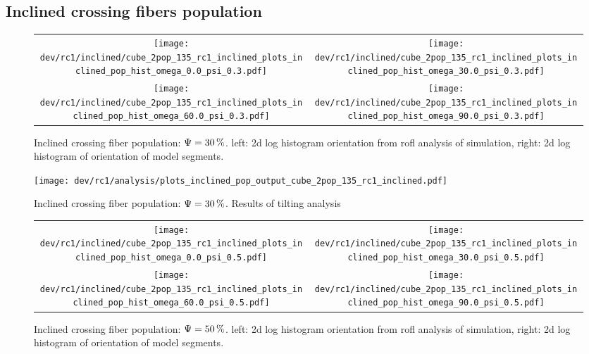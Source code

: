 \subsection{Inclined crossing fibers population}
\label{sec:resInclCross}
% 
\begin{figure}[!t]
\centering
\setlength{\width}{0.45\textwidth}
\begin{tabular}{c|c}
    \texttt{[image: dev/rc1/inclined/cube\_2pop\_135\_rc1\_inclined\_plots\_inclined\_pop\_hist\_omega\_0.0\_psi\_0.3.pdf]} &
    \texttt{[image: dev/rc1/inclined/cube\_2pop\_135\_rc1\_inclined\_plots\_inclined\_pop\_hist\_omega\_30.0\_psi\_0.3.pdf]} \\ \texttt{[image: dev/rc1/inclined/cube\_2pop\_135\_rc1\_inclined\_plots\_inclined\_pop\_hist\_omega\_60.0\_psi\_0.3.pdf]} & \texttt{[image: dev/rc1/inclined/cube\_2pop\_135\_rc1\_inclined\_plots\_inclined\_pop\_hist\_omega\_90.0\_psi\_0.3.pdf]}
\end{tabular}
% 
\caption[sim]{Inclined crossing fiber population: $\textnormal{$\Psi$}=\SI{30}{\percent}$. left: 2d log histogram orientation from rofl analysis of simulation, right: 2d log histogram of orientation of model segments. }
\label{fig:inclined_03_fiber_pop_hist}
\end{figure}
% 
\begin{figure}[!p]
\centering
\texttt{[image: dev/rc1/analysis/plots\_inclined\_pop\_output\_cube\_2pop\_135\_rc1\_inclined.pdf]}
\caption[]{Inclined crossing fiber population: $\textnormal{$\Psi$}=\SI{30}{\percent}$. Results of tilting analysis}
\label{fig:inclined_03_fiber_pop_rofl}
\end{figure}
% 
\begin{figure}[!t]
\centering
\setlength{\width}{0.4\textwidth}
\begin{tabular}{c|c}
    \texttt{[image: dev/rc1/inclined/cube\_2pop\_135\_rc1\_inclined\_plots\_inclined\_pop\_hist\_omega\_0.0\_psi\_0.5.pdf]} &
    \texttt{[image: dev/rc1/inclined/cube\_2pop\_135\_rc1\_inclined\_plots\_inclined\_pop\_hist\_omega\_30.0\_psi\_0.5.pdf]} \\
    \texttt{[image: dev/rc1/inclined/cube\_2pop\_135\_rc1\_inclined\_plots\_inclined\_pop\_hist\_omega\_60.0\_psi\_0.5.pdf]} &
    \texttt{[image: dev/rc1/inclined/cube\_2pop\_135\_rc1\_inclined\_plots\_inclined\_pop\_hist\_omega\_90.0\_psi\_0.5.pdf]}
\end{tabular}
\caption[sim]{Inclined crossing fiber population: $\textnormal{$\Psi$}=\SI{50}{\percent}$. left: 2d log histogram orientation from rofl analysis of simulation, right: 2d log histogram of orientation of model segments. }
\label{fig:inclined_05_fiber_pop_hist}
\end{figure}
